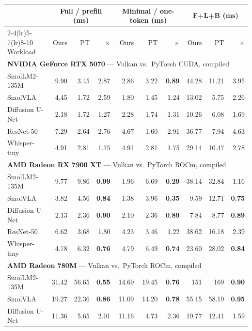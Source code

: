 \begin{tabular}{l rrr rrr rrr}
\toprule
 & \multicolumn{3}{c}{Full / prefill (ms)} & \multicolumn{3}{c}{Minimal / one-token (ms)} & \multicolumn{3}{c}{F+L+B (ms)} \\
\cmidrule(lr){2-4}\cmidrule(lr){5-7}\cmidrule(lr){8-10}
Workload & Ours & PT & $\times$ & Ours & PT & $\times$ & Ours & PT & $\times$ \\
\midrule
\multicolumn{10}{l}{\textbf{NVIDIA GeForce RTX 5070} --- \system{} Vulkan vs.\ PyTorch CUDA, compiled} \\
SmolLM2-135M & 9.90 & 3.45 & 2.87 & 2.86 & 3.22 & \textbf{0.89} & 44.28 & 11.21 & 3.95 \\
SmolVLA & 4.45 & 1.72 & 2.59 & 1.80 & 1.45 & 1.24 & 13.02 & 5.75 & 2.26 \\
Diffusion U-Net & 2.18 & 1.72 & 1.27 & 2.28 & 1.74 & 1.31 & 10.26 & 6.08 & 1.69 \\
ResNet-50 & 7.29 & 2.64 & 2.76 & 4.67 & 1.60 & 2.91 & 36.77 & 7.94 & 4.63 \\
Whisper-tiny & 4.91 & 2.81 & 1.75 & 4.91 & 2.81 & 1.75 & 29.14 & 10.47 & 2.78 \\
\midrule
\multicolumn{10}{l}{\textbf{AMD Radeon RX 7900 XT} --- \system{} Vulkan vs.\ PyTorch ROCm, compiled} \\
SmolLM2-135M & 9.77 & 9.86 & \textbf{0.99} & 1.96 & 6.69 & \textbf{0.29} & 38.14 & 32.84 & 1.16 \\
SmolVLA & 3.82 & 4.56 & \textbf{0.84} & 1.38 & 3.96 & \textbf{0.35} & 9.59 & 12.71 & \textbf{0.75} \\
Diffusion U-Net & 2.13 & 2.36 & \textbf{0.90} & 2.10 & 2.36 & \textbf{0.89} & 7.84 & 8.77 & \textbf{0.89} \\
ResNet-50 & 6.62 & 3.68 & 1.80 & 4.23 & 3.46 & 1.22 & 38.62 & 16.18 & 2.39 \\
Whisper-tiny & 4.78 & 6.32 & \textbf{0.76} & 4.79 & 6.49 & \textbf{0.74} & 23.60 & 28.02 & \textbf{0.84} \\
\midrule
\multicolumn{10}{l}{\textbf{AMD Radeon 780M} --- \system{} Vulkan vs.\ PyTorch ROCm, compiled} \\
SmolLM2-135M & 31.42 & 56.65 & \textbf{0.55} & 14.69 & 19.45 & \textbf{0.76} & 151 & 169 & \textbf{0.90} \\
SmolVLA & 19.27 & 22.36 & \textbf{0.86} & 11.09 & 14.20 & \textbf{0.78} & 55.15 & 58.19 & \textbf{0.95} \\
Diffusion U-Net & 11.36 & 5.65 & 2.01 & 11.16 & 4.73 & 2.36 & 19.77 & 12.41 & 1.59 \\

\end{tabular}
